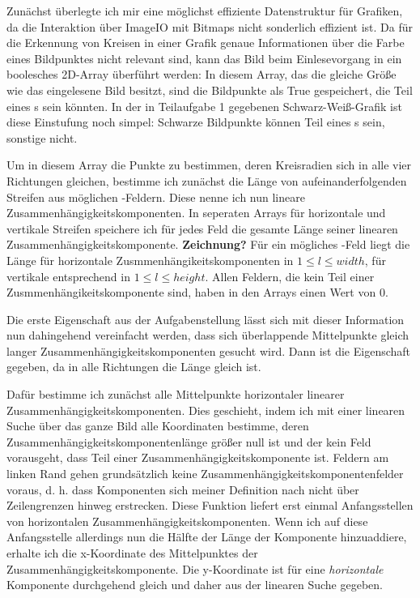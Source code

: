 Zunächst überlegte ich mir eine möglichst effiziente Datenstruktur für Grafiken, da die Interaktion über ImageIO mit Bitmaps nicht sonderlich effizient ist. Da für die Erkennung von Kreisen in einer Grafik genaue Informationen über die Farbe eines Bildpunktes nicht relevant sind, kann das Bild beim Einlesevorgang in ein boolesches 2D-Array überführt werden: In diesem Array, das die gleiche Größe wie das eingelesene Bild besitzt, sind die Bildpunkte als True gespeichert, die Teil eines \task{}s sein könnten. In der in Teilaufgabe 1 gegebenen Schwarz-Weiß-Grafik ist diese Einstufung noch simpel: Schwarze Bildpunkte können Teil eines \task{}s sein, sonstige nicht.

Um in diesem Array die Punkte zu bestimmen, deren Kreisradien sich in alle vier Richtungen gleichen, bestimme ich zunächst die Länge von aufeinanderfolgenden Streifen aus möglichen \task{}-Feldern. Diese nenne ich nun lineare Zusammenhängigkeitskomponenten. In seperaten Arrays für horizontale und vertikale Streifen speichere ich für jedes Feld die gesamte Länge seiner linearen Zusammenhängigkeitskomponente. \textbf{Zeichnung?} 
Für ein mögliches \task{}-Feld liegt die Länge für horizontale Zusmmenhängikeitskomponenten in \(1 \le l \le width\), für vertikale entsprechend in \(1 \le l \le height\). Allen Feldern, die kein Teil einer Zusmmenhängikeitskomponente sind, haben in den Arrays einen Wert von \(0\). 

Die erste Eigenschaft aus der Aufgabenstellung lässt sich mit dieser Information nun dahingehend vereinfacht werden, dass sich überlappende Mittelpunkte gleich langer Zusammenhängigkeitskomponenten gesucht wird. Dann ist die Eigenschaft gegeben, da in alle Richtungen die Länge gleich ist.

Dafür bestimme ich zunächst alle Mittelpunkte horizontaler linearer Zusammenhängigkeitskomponenten. Dies geschieht, indem ich mit einer linearen Suche über das ganze Bild alle Koordinaten bestimme, deren Zusammenhängigkeitskomponentenlänge größer null ist und der kein Feld vorausgeht, dass Teil einer Zusammenhängigkeitskomponente ist. Feldern am linken Rand gehen grundsätzlich keine Zusammenhängigkeitskomponentenfelder voraus, d. h. dass Komponenten sich meiner Definition nach nicht über Zeilengrenzen hinweg erstrecken. Diese Funktion liefert erst einmal Anfangsstellen von horizontalen Zusammenhängigkeitskomponenten. Wenn ich auf diese Anfangsstelle allerdings nun die Hälfte der Länge der Komponente hinzuaddiere, erhalte ich die x-Koordinate des Mittelpunktes der Zusammenhängigkeitskomponente. Die y-Koordinate ist für eine \textit{horizontale} Komponente durchgehend gleich und daher aus der linearen Suche gegeben.

